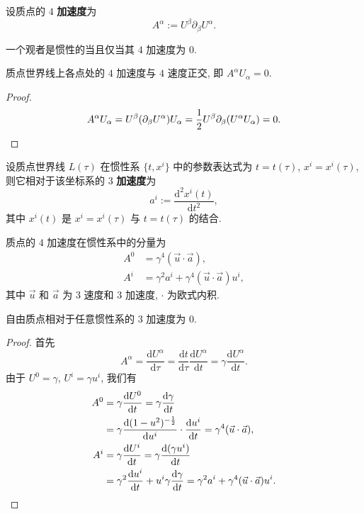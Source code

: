 \begin{definition}[$ 4 $ 加速度]
    设质点的 $ 4 $ {\bf 加速度}为
    \[ A^\alpha:=U^\beta\partial_\beta U^{\alpha}. \]
\end{definition}

\begin{remark}
    一个观者是惯性的当且仅当其 $4$ 加速度为 $0$.
\end{remark}

\begin{proposition}
    质点世界线上各点处的 $ 4 $ 加速度与 $ 4 $ 速度正交, 即 $ A^\alpha U_\alpha=0$.
\end{proposition}
\begin{proof}\keepline
    \[ A^\alpha U_\alpha=U^\beta(\partial_\beta U^\alpha)U_\alpha=\frac{1}{2}U^\beta\partial_\beta(U^\alpha U_\alpha)=0.\qedhere \]
\end{proof}

\begin{definition}[$ 3 $ 加速度]
    设质点世界线 $ L(\tau) $ 在惯性系 $ \{t,x^i\} $ 中的参数表达式为 $ t=t(\tau) $, $ x^i=x^i(\tau) $, 则它相对于该坐标系的 $ 3 $ {\bf 加速度}为
    \[ a^i:=\frac{\mathrm{d}^2 x^i(t)}{\mathrm{d}t^2}, \]
    其中 $ x^i(t) $ 是 $ x^i=x^i(\tau) $ 与 $ t=t(\tau) $ 的结合.
\end{definition}
\begin{proposition}
    \label{4 force}
    质点的 $ 4 $ 加速度在惯性系中的分量为
    \begin{align*}
        A^0&=\gamma^4(\vec{u}\cdot \vec{a}),\\
        A^i&=\gamma^2a^i+\gamma^4(\vec{u}\cdot \vec{a})u^i,
    \end{align*}
    其中 $ \vec{u} $ 和 $ \vec{a} $ 为 $ 3 $ 速度和 $ 3 $ 加速度, $ \cdot $ 为欧式内积.
\end{proposition}
\begin{remark}
    自由质点相对于任意惯性系的 $ 3 $ 加速度为 $ 0 $.
\end{remark}
\begin{proof}
    首先
    \[ A^\alpha=\frac{\mathrm{d} U^\alpha}{\mathrm{d} \tau}=\frac{\mathrm{d} t}{\mathrm{d} \tau}\frac{\mathrm{d} U^\alpha}{\mathrm{d} t}=\gamma\frac{\mathrm{d} U^\alpha}{\mathrm{d} t}. \]
    由于 $ U^0=\gamma $, $ U^i=\gamma u^i $, 我们有
    \begin{align*}
        A^0 &= \gamma\frac{\mathrm{d}U^0}{\mathrm{d}t}=\gamma\frac{\mathrm{d}\gamma}{\mathrm{d}t}\\ 
        &=\gamma\frac{\mathrm{d}(1-u^2)^{-\frac{1}{2}}}{\mathrm{d}u^i}\cdot\frac{\mathrm{d}u^i}{\mathrm{d}t}=\gamma^4(\vec{u}\cdot \vec{a}),\\ 
        A^i&=\gamma\frac{\mathrm{d}U^i}{\mathrm{d}t}=\gamma\frac{\mathrm{d}(\gamma u^i)}{\mathrm{d}t}\\ 
        &=\gamma^2\frac{\mathrm{d}u^i}{\mathrm{d}t}+u^i\gamma\frac{\mathrm{d}\gamma}{\mathrm{d}t}=\gamma^2a^i+\gamma^4(\vec{u}\cdot \vec{a})u^i.\qedhere
    \end{align*}
\end{proof}


